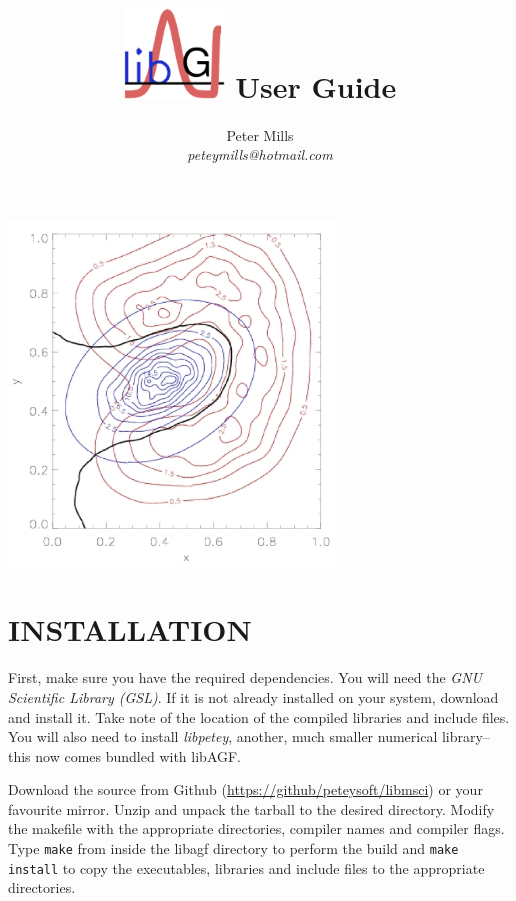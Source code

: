 \documentclass[12pt]{article}
\begin{document}
\title{\includegraphics[width=0.2\textwidth]{agflogo} User Guide}
\author{Peter Mills\\\textit{peteymills@hotmail.com}}

\maketitle

\begin{center}
	\includegraphics[width=0.65\textwidth]{sc}
\end{center}

\newpage

\tableofcontents

\newpage

\section{INSTALLATION}

  First, make sure you have the required dependencies.  You will need the {\it GNU Scientific Library (GSL)}.  If it is not already installed on your system, download and install it.  Take note of the location of the compiled libraries and include files.  You will also need to install {\it libpetey}, another, much smaller numerical library--this now comes bundled with libAGF.

  Download the source from Github (\url{https://github/peteysoft/libmsci}) or your favourite mirror.  Unzip and unpack the tarball to the desired directory.  Modify the makefile with the appropriate directories, compiler names and compiler flags.  Type \verb"make" from inside the libagf directory to perform the build and \verb"make install" to copy the executables, libraries and include files to the appropriate directories.
\end{document}
